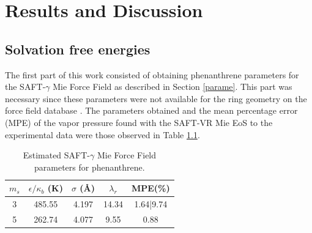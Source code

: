 \chapter{Results and Discussion} %

\label{Chapter5} %

\section{Solvation free energies}

The first part of this work consisted of obtaining phenanthrene parameters for the SAFT-$\gamma$ Mie Force Field as described in Section \ref{parame}. This part was necessary since these parameters were not available for the ring geometry on the force field database \cite{ervik2016}. The parameters obtained and the mean percentage error (MPE) of the vapor pressure found with the SAFT-VR Mie EoS to the experimental data \cite{pvphen} were those observed in Table \ref{tbl:estimparameters}.

\begin{table}[h]
	\centering
	\caption{Estimated SAFT-$\gamma$ Mie Force Field parameters for phenanthrene.}
	\label{tbl:estimparameters}
	\begin{tabular}{ccccc}
		\hline\hline
		$m_s$                & $\epsilon/\kappa_{b}$ (K) & $\sigma$ (\AA) & $\lambda_r$ & MPE(\%)   \\ \hline\hline
		3 \cite{lafitte2012} & 485.55               & 4.197              & 14.34       & 1.64|9.74 \\
		5  \cite{muller2017} & 262.74               & 4.077              & 9.55        & 0.88      \\ \hline\hline
	\end{tabular}
	
\end{table} 

